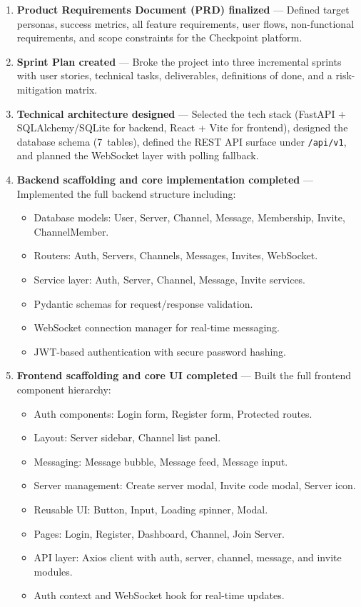 \documentclass[11pt]{article}
\begin{document}
\begin{enumerate}[leftmargin=1.5em]
    \item \textbf{Product Requirements Document (PRD) finalized} --- Defined target personas, success metrics, all feature requirements, user flows, non-functional requirements, and scope constraints for the Checkpoint platform.

    \item \textbf{Sprint Plan created} --- Broke the project into three incremental sprints with user stories, technical tasks, deliverables, definitions of done, and a risk-mitigation matrix.

    \item \textbf{Technical architecture designed} --- Selected the tech stack (FastAPI + SQLAlchemy/SQLite for backend, React + Vite for frontend), designed the database schema (7~tables), defined the REST API surface under \texttt{/api/v1}, and planned the WebSocket layer with polling fallback.

    \item \textbf{Backend scaffolding and core implementation completed} --- Implemented the full backend structure including:
    \begin{itemize}[leftmargin=1.5em]
        \item Database models: User, Server, Channel, Message, Membership, Invite, ChannelMember.
        \item Routers: Auth, Servers, Channels, Messages, Invites, WebSocket.
        \item Service layer: Auth, Server, Channel, Message, Invite services.
        \item Pydantic schemas for request/response validation.
        \item WebSocket connection manager for real-time messaging.
        \item JWT-based authentication with secure password hashing.
    \end{itemize}

    \item \textbf{Frontend scaffolding and core UI completed} --- Built the full frontend component hierarchy:
    \begin{itemize}[leftmargin=1.5em]
        \item Auth components: Login form, Register form, Protected routes.
        \item Layout: Server sidebar, Channel list panel.
        \item Messaging: Message bubble, Message feed, Message input.
        \item Server management: Create server modal, Invite code modal, Server icon.
        \item Reusable UI: Button, Input, Loading spinner, Modal.
        \item Pages: Login, Register, Dashboard, Channel, Join Server.
        \item API layer: Axios client with auth, server, channel, message, and invite modules.
        \item Auth context and WebSocket hook for real-time updates.
    \end{itemize}
\end{enumerate}
\end{document}
